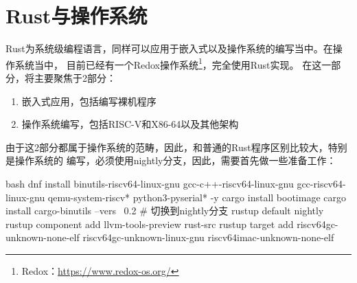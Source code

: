 \chapter{Rust与操作系统}
Rust为系统级编程语言，同样可以应用于嵌入式以及操作系统的编写当中。在操作系统当中，
目前已经有一个Redox操作系统\footnote{Redox：\url{https://www.redox-os.org/}}，完全使用Rust实现。
在这一部分，将主要聚焦于2部分：
\begin{enumerate}
  \item 嵌入式应用，包括编写裸机程序
  \item 操作系统编写，包括RISC-V和X86-64以及其他架构
\end{enumerate}

由于这2部分都属于操作系统的范畴，因此，和普通的Rust程序区别比较大，特别是操作系统的
编写，必须使用nightly分支，因此，需要首先做一些准备工作：
\begin{code-block}{bash}
dnf install binutils-riscv64-linux-gnu gcc-c++-riscv64-linux-gnu gcc-riscv64-linux-gnu qemu-system-riscv* python3-pyserial* -y
cargo install bootimage
cargo install cargo-binutils --vers ~0.2
# 切换到nightly分支
rustup default nightly
rustup component add llvm-tools-preview rust-src
rustup target add riscv64gc-unknown-none-elf riscv64gc-unknown-linux-gnu riscv64imac-unknown-none-elf
\end{code-block}
